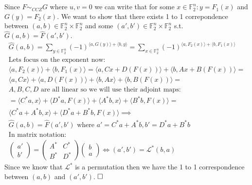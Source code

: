 \documentclass[12pt, a4paper]{article}
\newcommand{\qed}{\hfill\square}
\begin{document}
\section{}
Since $F \sim_{CCZ}G$ where $u,v=0$ we can write that for some $x \in \mathbb{F}_2^n: y = F_1(x)$ and $G(y)=F_2(x)$. We want to show that there exists 1 to 1 correpondence between $(a,b) \in \mathbb{F}_2^n \times \mathbb{F}_2^n $ and some $(a',b') \in \mathbb{F}_2^n \times \mathbb{F}_2^n$ s.t. $\hat{G}(a,b) = \hat{F}(a',b')$.
\begin{gather*}
\hat{G}(a,b) = \sum\limits_{y \in \mathbb{F}_2^n} (-1)^{\langle a,G(y) \rangle + \langle b, y \rangle} =  \sum\limits_{x \in \mathbb{F}_2^n} (-1)^{\langle a,F_2(x) \rangle + \langle b, F_1(x) \rangle}\\
\text{Lets focus on the exponent now:}\\
\langle a,F_2(x) \rangle + \langle b, F_1(x) \rangle = \langle a,Cx + D(F(x)) \rangle + \langle b, Ax + B(F(x)) \rangle = \\
\langle a,Cx \rangle + \langle a,D(F(x)) \rangle + \langle b, Ax \rangle  + \langle b,B(F(x)) \rangle =\\
\text{$A,B,C,D$ are all linear so we will use their adjoint maps:}\\
= \langle C^*a,x \rangle + \langle D^*a,F(x) \rangle + \langle A^*b, x \rangle  + \langle B^*b,F(x) \rangle = \\
\langle C^*a + A^*b, x \rangle + \langle D^*a + B^*b, F(x) \rangle \implies\\
\hat{G}(a,b) = \hat{F}(a',b') \text{ where } a' = C^*a + A^*b, b' = D^*a + B^*b\\
\text{In matrix notation:}\\
\begin{pmatrix}
a'\\
b'
\end{pmatrix} =
\begin{pmatrix}
A^* & C^*\\
B^* & D^*
\end{pmatrix}\begin{pmatrix}
b\\
a
\end{pmatrix} \iff (a',b') = \mathcal{L}^*(b,a)
\end{gather*}
Since we know that $\mathcal{L}^*$ is a permutation then we have the 1 to 1 correspondence between $(a,b)$ and $(a',b')$.
$\qed$
\end{document}
